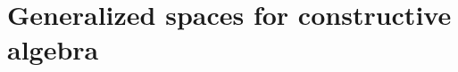 \documentclass{ws-rv9x6}
\begin{document}
{
\newcommand{\hcancel}[5]{%
  \tikz[baseline=(tocancel.base)]{
    \node[inner sep=0pt,outer sep=0pt] (tocancel) {#1};
    \draw[black, line width=0.2mm] ($(tocancel.south west)+(#2,#3)$) -- ($(tocancel.north east)+(#4,#5)$);
  }%
}
\newtheorem{exercise}{Exercise}
\let\Exercisefont\upshape
\def\Exerciseheadfont{\bfseries}

\newcommand{\CCC}{\mathcal{C}}
\newcommand{\OOO}{\mathcal{O}}
\newcommand{\NN}{\mathbb{N}}
\newcommand{\QQ}{\mathbb{Q}}
\newcommand{\RR}{\mathbb{R}}
\newcommand{\TT}{\mathbb{T}}
\newcommand{\ZZ}{\mathbb{Z}}
\newcommand{\CC}{\mathbb{C}}
\newcommand{\aaa}{\mathfrak{a}}
\newcommand{\bbb}{\mathfrak{b}}
\newcommand{\ppp}{\mathfrak{p}}
\newcommand{\qqq}{\mathfrak{q}}
\newcommand{\mmm}{\mathfrak{m}}
\newcommand{\fff}{\mathfrak{f}}
\newcommand{\defeq}{\vcentcolon=}
\newcommand{\defeqv}{\vcentcolon\equiv}
\newcommand{\Sh}{\mathrm{Sh}}
\newcommand{\ab}{\mathrm{ab}}
\newcommand{\op}{\mathrm{op}}
\newcommand{\Set}{\mathrm{Set}}
\newcommand{\Hom}{\mathrm{Hom}}
\newcommand{\Spec}{\mathrm{Spec}}
\newcommand{\Max}{\mathrm{Max}}
\newcommand{\Gal}{\mathrm{Gal}}
\newcommand{\Rad}{\mathrm{Rad}}
\newcommand{\Idl}{\mathrm{Idl}}
\newcommand{\+}{\mathpunct{.}}
\newcommand{\?}{\,{:}\,}
\newcommand{\seq}[1]{\mathrel{\vdash\!\!\!_{#1}}}
\newcommand{\pt}{\mathrm{pt}}
\newcommand{\Pt}{\mathrm{Pt}}
\newcommand{\Loc}{\mathrm{Loc}}
\newcommand{\Top}{\mathrm{Top}}
\newcommand{\ann}{\operatorname{ann}}
\newcommand{\BPIT}{\textsc{bpit}\xspace}
\newcommand{\notnot}{\emph{not not}\xspace}
\newcommand{\negg}{\neg\!\!\!\neg}
\newcommand{\bott}{\bot\!\!\!\!\bot}
\newcommand{\brak}[1]{{\llbracket{#1}\rrbracket}}

\newcommand{\bracketedrefcite}[1]{\citep{#1}}

\chapter{Generalized spaces for constructive algebra}

\author[I. Blechschmidt]{Ingo Blechschmidt}

\address{Università di Verona \\
Department of Computer Science \\
Strada le Grazie 15 \\
37134 Verona, Italy}

}
\end{document}
